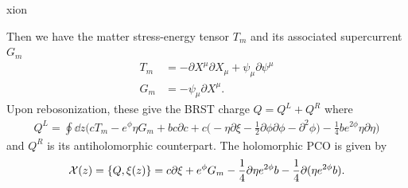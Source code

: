 xion\documentclass[12pt]{article}
\def\be{\begin{equation}}
\def\ee{\end{equation}}
\numberwithin{equation}{section}
\begin{document}
Then we have the matter stress-energy tensor $T_m$ and its associated supercurrent $G_m$
\be
\begin{aligned}
    T_m &= - \partial X^\mu \partial X_\mu + \psi_\mu \partial \psi^\mu \\
    G_m &= - \psi_\mu \partial X^\mu.
\end{aligned}
\ee
Upon rebosonization, these give the BRST charge $Q = Q^L + Q^R$ where
\begin{align}
  Q^L = \oint \dd z \biggr(c T_m - e^{\phi} \eta G_m + b c \partial c + c\big(-\eta \partial \xi - \frac{1}{2} \partial \phi \partial \phi - \partial^2 \phi\big) - \frac{1}{4} b e^{2\phi}\eta \partial \eta\biggr)
\end{align}
and $Q^R$ is its antiholomorphic counterpart. The holomorphic PCO is given by
\begin{equation}
    \mathcal{X}(z) = \acomm{Q}{\xi(z)} =  c \partial \xi + e^\phi G_m - \frac{1}{4} \partial \eta e^{2\phi}b-\frac{1}{4}\partial(\eta e^{2\phi}b).
\end{equation}
\end{document}
